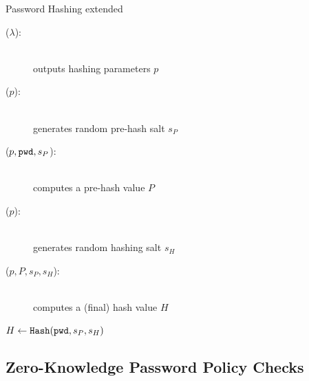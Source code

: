 \documentclass[notes,xcolor=dvipsnames]{beamer}
\begin{document}
\begin{frame}{Password Hashing}
  extended \cite{BenhamoudaP13}
  \begin{description}
    \item[\PSetup($\lambda$):] \hfill\\ outputs hashing parameters $p$
    \item[\PPHSalt($p$):] \hfill\\	generates random pre-hash salt $s_P$
    \item[\PPreHash($p, \mathtt{pwd}, s_P$):] \hfill\\	computes a pre-hash value $P$
    \item[\PHSalt($p$):] \hfill\\ generates random hashing salt $s_H$
    \item[\PHash($p, P, s_P, s_H$):]	\hfill\\ computes a (final) hash value $H$
  \end{description}
  $H\gets\mathtt{Hash}(\mathtt{pwd}, s_P, s_H)$ %
\end{frame}

\subsection[ZKPPC]{Zero-Knowledge Password Policy Checks}

%   
%   
\end{document}

